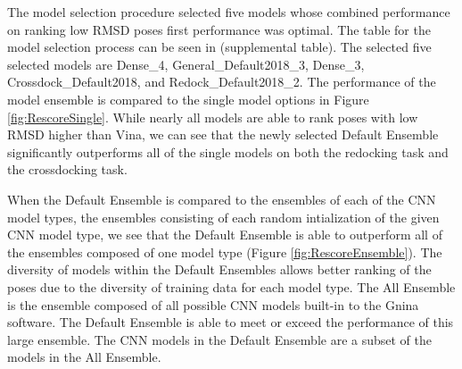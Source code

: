 \documentclass[journal=jcisd8,manuscript=article]{achemso}
\begin{document}
The model selection procedure selected five models whose combined performance on ranking low RMSD poses first performance was optimal. The table for the model selection process can be seen in (supplemental table). The selected five selected models are Dense\_4, General\_Default2018\_3, Dense\_3, Crossdock\_Default2018, and Redock\_Default2018\_2. The performance of the model ensemble is compared to the single model options in Figure \ref{fig:RescoreSingle}. While nearly all models are able to rank poses with low RMSD higher than Vina, we can see that the newly selected Default Ensemble significantly outperforms all of the single models on both the redocking task and the crossdocking task.  

When the Default Ensemble is compared to the ensembles of each of the CNN model types, the ensembles consisting of each random intialization of the given CNN model type, we see that the Default Ensemble is able to outperform all of the ensembles composed of one model type (Figure \ref{fig:RescoreEnsemble}). The diversity of models within the Default Ensembles allows better ranking of the poses due to the diversity of training data for each model type. The All Ensemble is the ensemble composed of all possible CNN models built-in to the Gnina software. The Default Ensemble is able to meet or exceed the performance of this large ensemble. The CNN models in the Default Ensemble are a subset of the models in the All Ensemble.
\end{document}
